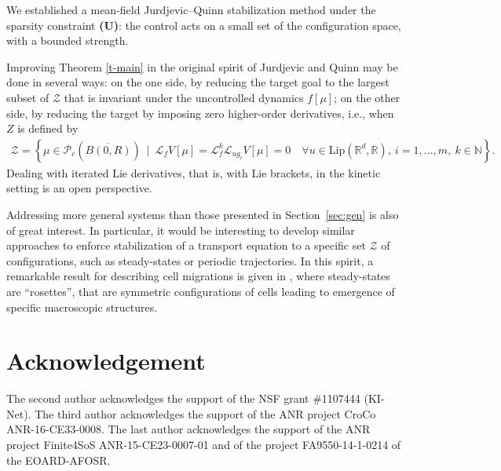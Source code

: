 \documentclass{article}
\newcommand{\R}{\mathbb{R}}
\newcommand{\N}{\mathbb{N}}
\renewcommand{\L}{\mathcal{L}}
\newcommand{\PR}{\mathcal{P}_c(\overline{B(0,R)})}
\theoremstyle{definition}\newtheorem{remark}{Remark}
\newcommand{\Pg}[1]{\left\{ #1 \right\}}
\newcommand{\bqn}{\begin{eqnarray}}
\newcommand{\eqnn}{\nonumber\end{eqnarray}}
\newcommand{\Lip}{\mathrm{Lip}}
\begin{document}
We established a mean-field Jurdjevic--Quinn stabilization method under the sparsity constraint {\bf (U)}: the control acts on a small set of the configuration space, with a bounded strength.

Improving Theorem \ref{t-main} in the original spirit of Jurdjevic and Quinn may be done in several ways: on the one side, by reducing the target goal to the largest subset of $\mathcal{Z}$ that is invariant under the uncontrolled dynamics $f[\mu]$; on the other side, by reducing the target by imposing zero higher-order derivatives, i.e., when $Z$ is defined by
\bqn
\mathcal{Z}=\Pg{\mu\in\PR\ \mid\ \L_fV[\mu]=\L_{f}^k \L_{ug_i}V[\mu]=0 \quad \forall u\in\Lip(\R^d,\R),\ i=1,\ldots,m,\ k\in\N}.
\eqnn
Dealing with iterated Lie derivatives, that is, with Lie brackets, in the kinetic setting is an open perspective.

Addressing more general systems than those presented in Section~\ref{sec:gen} is also of great interest. In particular, it would be interesting to develop similar approaches to enforce stabilization of a transport equation to a specific set $\mathcal{Z}$ of configurations, such as steady-states or periodic trajectories. In this spirit, a remarkable result for describing cell migrations is given in \cite{natalini}, where steady-states are ``rosettes'', that are symmetric configurations of cells leading to emergence of specific macroscopic structures.


\section*{Acknowledgement}
The second author acknowledges the support of the  NSF grant \#1107444 (KI-Net). The third author acknowledges the support of the ANR project CroCo ANR-16-CE33-0008. The last author acknowledges the support of the ANR project Finite4SoS ANR-15-CE23-0007-01 and of the project FA9550-14-1-0214 of the EOARD-AFOSR.
\end{document}
